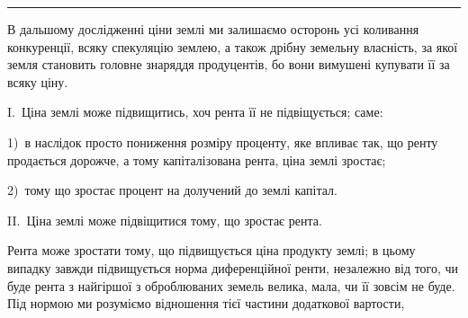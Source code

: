 \pfbreak

В дальшому дослідженні ціни землі ми залишаємо осторонь усі коливання
конкуренції, всяку спекуляцію землею, а також дрібну земельну власність, за
якої земля становить головне знаряддя продуцентів, бо вони вимушені купувати її
за всяку ціну.

I.~Ціна землі може підвищитись, хоч рента її не підвіщується; саме:

1)~в наслідок просто пониження розміру проценту, яке впливає так, що
ренту продається дорожче, а тому капіталізована рента, ціна землі зростає;

2)~тому що зростає процент на долучений до землі капітал.

II.~Ціна землі може підвіщитися тому, що зростає рента.

Рента може зростати тому, що підвищується ціна продукту землі; в цьому
випадку завжди підвищується норма диференційної ренти, незалежно від того,
чи буде рента з найгіршої з оброблюваних земель велика, мала, чи її зовсім
не буде. Під нормою ми розуміємо відношення тієї частини додаткової вартости,
\parbreak{}  %
